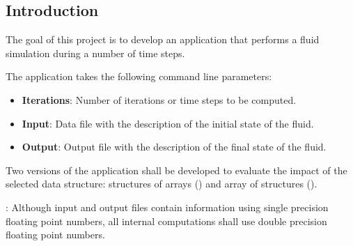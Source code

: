 \subsection{Introduction}

The goal of this project is to develop an application that performs a fluid
simulation during a number of time steps.

The application takes the following command line parameters:
\begin{itemize}
\item \textbf{Iterations}: Number of iterations or time steps to be computed.
\item \textbf{Input}: Data file with the description of the initial state of the
fluid.
\item \textbf{Output}: Output file with the description of the final state of
the fluid.
\end{itemize}

Two versions of the application shall be developed to evaluate the impact of the
selected data structure: structures of arrays () and array of
structures ().

: Although input and output files contain information using
single precision floating point numbers, all internal computations shall use
double precision floating point numbers.
